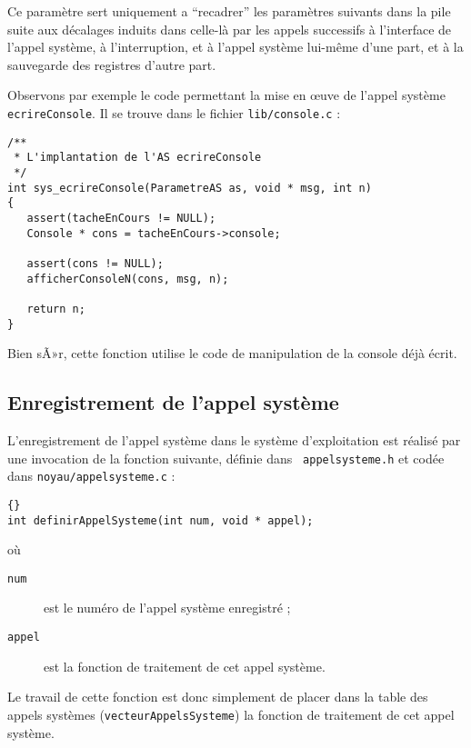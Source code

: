    Ce paramètre sert uniquement a ``recadrer'' les paramètres suivants 
dans la pile suite aux décalages induits dans celle-là par les appels
successifs à l'interface de l'appel système, à l'interruption, et à
l'appel système lui-même d'une part, et à la sauvegarde des registres
d'autre part.

   Observons par exemple le code permettant la mise en \oe{}uve de
l'appel système \lstinline!ecrireConsole!. Il se trouve dans le
fichier {\tt lib/console.c} :

\begin{lstlisting}
/**
 * L'implantation de l'AS ecrireConsole
 */
int sys_ecrireConsole(ParametreAS as, void * msg, int n)
{
   assert(tacheEnCours != NULL);
   Console * cons = tacheEnCours->console;
   
   assert(cons != NULL);
   afficherConsoleN(cons, msg, n);

   return n; 
}
\end{lstlisting}

   Bien sÃ»r, cette fonction utilise le code de manipulation de la
console déjà écrit.   

\subsection{Enregistrement de l'appel système}

   L'enregistrement de l'appel système dans le système d'exploitation est
réalisé par une invocation de la fonction suivante, définie dans {\tt
appelsysteme.h} et codée dans {\tt noyau/appelsysteme.c} :

\begin{lstlisting}{}
int definirAppelSysteme(int num, void * appel);
\end{lstlisting}

   où 

\begin{description}
   \item[\lstinline!num!] est le numéro de l'appel système enregistré ;
   \item[\lstinline!appel!] est la fonction de traitement de cet appel
système.
\end{description}

   Le travail de cette fonction est donc simplement de placer dans la
table des appels systèmes (\lstinline!vecteurAppelsSysteme!) la
fonction de traitement de cet appel système.

